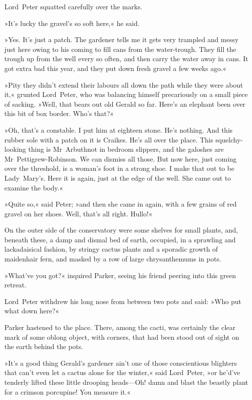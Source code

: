 Lord~Peter squatted carefully over the marks.

»It's lucky the gravel's so soft here,« he said.

»Yes. It's just a patch. The gardener tells me it gets very trampled and messy just here owing to his coming to fill cans from the water-trough. They fill the trough up from the well every so often, and then carry the water away in cans. It got extra bad this year, and they put down fresh gravel a few weeks ago.«

»Pity they didn't extend their labours all down the path while they were about it,« grunted Lord~Peter, who was balancing himself precariously on a small piece of sacking. »Well, that bears out old Gerald so far. Here's an elephant been over this bit of box border. Who's that?«

»Oh, that's a constable. I put him at eighteen stone. He's nothing. And this rubber sole with a patch on it is Craikes. He's all over the place. This squelchy-looking thing is Mr~Arbuthnot in bedroom slippers, and the galoshes are Mr~Pettigrew-Robinson. We can dismiss all those. But now here, just coming over the threshold, is a woman's foot in a strong shoe. I make that out to be Lady~Mary's. Here it is again, just at the edge of the well. She came out to examine the body.«

»Quite so,« said Peter; »and then she came in again, with a few grains of red gravel on her shoes. Well, that's all right. Hullo!«

On the outer side of the conservatory were some shelves for small plants, and, beneath these, a damp and dismal bed of earth, occupied, in a sprawling and lackadaisical fashion, by stringy cactus plants and a sporadic growth of maidenhair fern, and masked by a row of large chrysanthemums in pots.

»What've you got?« inquired Parker, seeing his friend peering into this green retreat.

Lord~Peter withdrew his long nose from between two pots and said: »Who put what down here?«

Parker hastened to the place. There, among the cacti, was certainly the clear mark of some oblong object, with corners, that had been stood out of sight on the earth behind the pots.

»It's a good thing Gerald's gardener ain't one of those conscientious blighters that can't even let a cactus alone for the winter,« said Lord~Peter, »or he'd've tenderly lifted these little drooping heads—Oh! damn and blast the beastly plant for a crimson porcupine! You measure it.«

